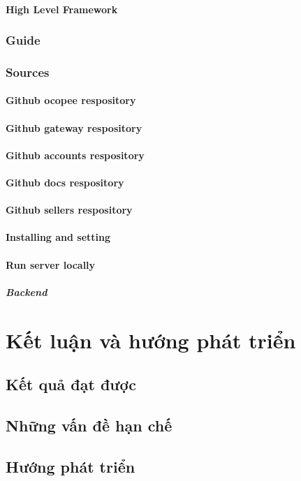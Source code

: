 \documentclass{report}
\begin{document}
\subsection{High Level Framework}
\section{Guide}
\section{Sources}
\subsection{Github ocopee respository}
\subsection{Github gateway respository}
\subsection{Github accounts respository}
\subsection{Github docs respository}
\subsection{Github sellers respository}
\subsection{Installing and setting}
\subsection{Run server locally}
\subsubsection{Backend}


\part*{Kết luận và hướng phát triển}
\chapter{Kết quả đạt được}
\chapter{Những vấn đề hạn chế}
\chapter{Hướng phát triển}



\end{document}
